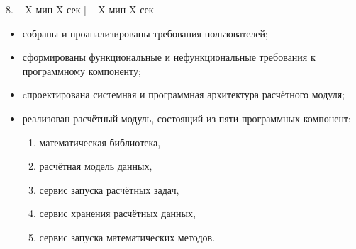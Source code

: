 \documentclass[a4paper,14pt]{extarticle}
\begin{document}
    8. ~ X мин X сек | ~ X мин X сек
    \begin{itemize}
    \item собраны и проанализированы требования пользователей;
    \item сформированы функциональные и нефункциональные требования к программному компоненту;
    \item cпроектирована системная и программная архитектура расчётного модуля;
    \item {
           реализован расчётный модуль, состоящий из пяти программных компонент:
            \begin{enumerate}
                \item математическая библиотека,
                \item расчётная модель данных,
                \item сервис запуска расчётных задач,
                \item сервис хранения расчётных данных,
                \item сервис запуска математических методов.
            \end{enumerate}
    }
\end{itemize}
\end{document}
